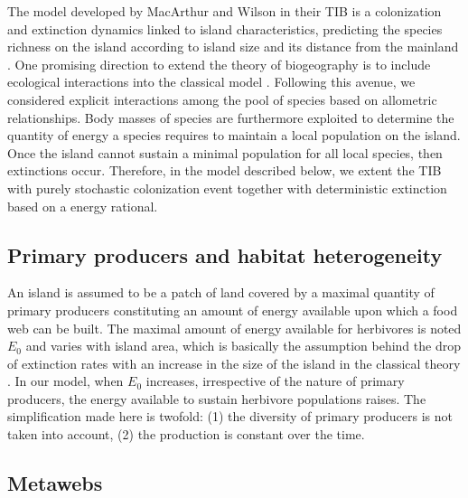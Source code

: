 The model developed by MacArthur and Wilson in their TIB is a
colonization and extinction dynamics linked to island characteristics,
predicting the species richness on the island according to island size
and its distance from the mainland \citep{MacArthur1967}. One promising
direction to extend the theory of biogeography is to include ecological
interactions into the classical model
\citep{Holt2010, Gravel2011, Cazelles2015a}. Following this avenue, we
considered explicit interactions among the pool of species based on
allometric relationships. Body masses of species are furthermore
exploited to determine the quantity of energy a species requires to
maintain a local population on the island. Once the island cannot
sustain a minimal population for all local species, then extinctions
occur. Therefore, in the model described below, we extent the TIB with
purely stochastic colonization event together with deterministic
extinction based on a energy rational.

\subsection{Primary producers and habitat
heterogeneity}\label{primary-producers-and-habitat-heterogeneity}

An island is assumed to be a patch of land covered by a maximal quantity
of primary producers constituting an amount of energy available upon
which a food web can be built. The maximal amount of energy available
for herbivores is noted \(E_0\) and varies with island area, which is
basically the assumption behind the drop of extinction rates with an
increase in the size of the island in the classical theory
\citep{MacArthur1967, Rabosky2015}. In our model, when \(E_0\)
increases, irrespective of the nature of primary producers, the energy
available to sustain herbivore populations raises. The simplification
made here is twofold: (1) the diversity of primary producers is not
taken into account, (2) the production is constant over the time.

\subsection{Metawebs}\label{metawebs}

